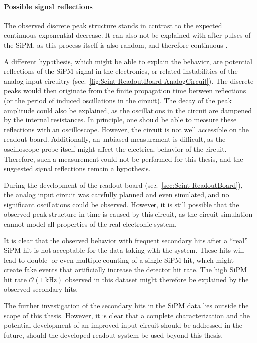 \paragraph{Possible signal reflections}
The observed discrete peak structure stands in contrast to the expected continuous exponential decrease. It can also not be explained with after-pulses of the \ac{SiPM}, as this process itself is also random, and therefore continuous \cite{SiPM-Para}.
\par A different hypothesis, which might be able to explain the behavior, are potential reflections of the \ac{SiPM} signal in the electronics, or related instabilities of the analog input circuitry (sec.\ \ref{fig:Scint-ReadoutBoard-AnalogCircuit}). The discrete peaks would then originate from the finite propagation time between reflections (or the period of induced oscillations in the circuit). The decay of the peak amplitude could also be explained, as the oscillations in the circuit are dampened by the internal resistances. In principle, one should be able to measure these reflections with an oscilloscope. However, the circuit is not well accessible on the readout board. Additionally, an unbiased measurement is difficult, as the oscilloscope probe itself might affect the electrical behavior of the circuit. Therefore, such a measurement could not be performed for this thesis, and the suggested signal reflections remain a hypothesis.
\par During the development of the readout board (sec.\ \ref{sec:Scint-ReadoutBoard}), the analog input circuit was carefully planned and even simulated, and no significant oscillations could be observed. However, it is still possible that the observed peak structure in time is caused by this circuit, as the circuit simulation cannot model all properties of the real electronic system.
\par It is clear that the observed behavior with frequent secondary hits after a \enquote{real} \ac{SiPM} hit is not acceptable for the data taking with the system. These hits will lead to double- or even multiple-counting of a single \ac{SiPM} hit, which might create fake events that artificially increase the detector hit rate. The high \ac{SiPM} hit rate $\mathcal{O}(\SI{1}{\kilo\hertz})$ observed in this dataset might therefore be explained by the observed secondary hits.
\par The further investigation of the secondary hits in the \ac{SiPM} data lies outside the scope of this thesis. However, it is clear that a complete characterization and the potential development of an improved input circuit should be addressed in the future, should the developed readout system be used beyond this thesis.
